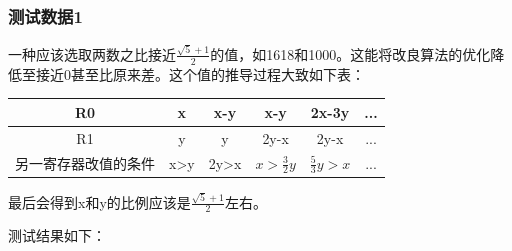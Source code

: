 \documentclass[UTF8]{article}
\begin{document}
	\subsubsection{测试数据1}
	一种应该选取两数之比接近$\frac{\sqrt{5}+1}{2}$的值，如1618和1000。这能将改良算法的优化降低至接近0甚至比原来差。这个值的推导过程大致如下表：\par
	\begin{tabular}{|c|c|c|c|c|c|}
		\hline 
		R0 & x & x-y & x-y & 2x-3y & ... \\ 
		\hline 
		R1 & y & y & 2y-x & 2y-x & ... \\ 
		\hline 
		另一寄存器改值的条件 & x>y & 2y>x & $x>\frac{3}{2}y$ & $\frac{5}{3}y>x$ & ... \\ 
		\hline 
	\end{tabular} \par
	最后会得到x和y的比例应该是$\frac{\sqrt{5}+1}{2}$左右。\par
	测试结果如下：\par
\end{document}
